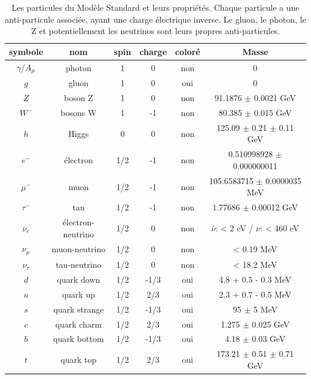 \begin{table}[h!]
  \centering
  \begin{tabular}{|c|c|c|c|c|c|}
  \hline
  symbole   & nom                 & spin & charge & coloré & Masse \\ \hline
  $\gamma$/$A_\mu$  & photon              & 1    & 0     & non    & 0    \\ \hline
  $g$       & gluon               & 1    & 0     & oui    &  0   \\ \hline
  $Z$       & boson Z             & 1    & 0     & non    & 91.1876 $\pm$ 0.0021 GeV \cite{olive_review_2014} \\ \hline
  $W^-$     & bosons W            & 1    & -1    & non    & 80.385 $\pm$ 0.015 GeV \cite{olive_review_2014} \\ \hline
  $h$       & Higgs               & 0    & 0     & non    & 125.09 $\pm$ 0.21 $\pm$ 0.11 GeV \cite{atlas_collaboration_combined_2015}  \\ \hline
  $e^-$     & \'electron          & 1/2  & -1    & non    & 0.510998928 $\pm$ 0.000000011 \cite{mohr_codata_2012} \\ \hline
  $\mu^-$   & muon                & 1/2  & -1    & non    & 105.6583715 $\pm$ 0.0000035 MeV \cite{mohr_codata_2012}    \\ \hline
  $\tau^-$  & tau                 & 1/2  & -1    & non    & 1.77686 $\pm$ 0.00012 GeV \cite{olive_review_2014}    \\ \hline
  $\nu_e$   & \'electron-neutrino & 1/2  & 0     & non    & $\bar{\nu}$: < 2 eV \cite{olive_review_2014} / $\nu$: < 460 eV \cite{yasumi_mass_1994} \\ \hline
  $\nu_\mu$ & muon-neutrino       & 1/2  & 0     & non    & < 0.19 MeV \cite{olive_review_2014}    \\ \hline
  $\nu_\tau$ & tau-neutrino       & 1/2  & 0     & non    &  < 18.2 MeV \cite{al_upper_1998}   \\ \hline
  $d$       & quark down          & 1/2  & -1/3  & oui    & 4.8 + 0.5 - 0.3 MeV \cite{olive_review_2014}     \\ \hline
  $u$       & quark up            & 1/2  & 2/3   & oui    & 2.3 + 0.7 - 0.5 MeV \cite{olive_review_2014}    \\ \hline
  $s$       & quark strange       & 1/2  & -1/3  & oui    & 95 $\pm$ 5 MeV \cite{olive_review_2014}    \\ \hline
  $c$       & quark charm         & 1/2  & 2/3   & oui    & 1.275 $\pm$ 0.025 GeV \cite{olive_review_2014}    \\ \hline
  $b$       & quark bottom        & 1/2  & -1/3  & oui    & 4.18 $\pm$ 0.03 GeV \cite{olive_review_2014}    \\ \hline
  $t$       & quark top           & 1/2  & 2/3   & oui    & 173.21 $\pm$ 0.51 $\pm$ 0.71 GeV \cite{olive_review_2014}    \\ \hline
\end{tabular}
\caption{Les particules du Modèle Standard et leurs propriétés. Chaque particule a une anti-particule associée,
  ayant une charge électrique inverse. Le gluon, le photon, le Z et potentiellement les neutrinos sont leurs
  propres anti-particules. }
\label{tab:ms_particules}
\end{table}

